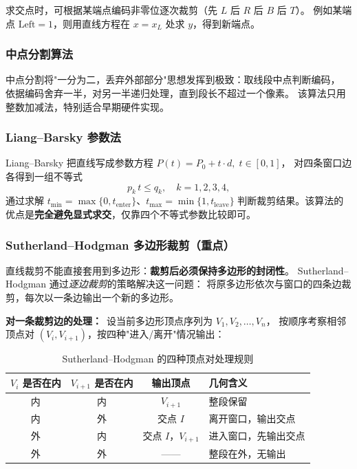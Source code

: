 \documentclass[a4paper,12pt]{ctexart}
\begin{document}
求交点时，可根据某端点编码非零位逐次裁剪（先 $L$ 后 $R$ 后 $B$ 后 $T$）。
例如某端点 $\text{Left}=1$，则用直线方程在 $x=x_L$ 处求 $y$，得到新端点。

\subsubsection{中点分割算法}

中点分割将"一分为二，丢弃外部部分"思想发挥到极致：取线段中点判断编码，
依据编码舍弃一半，对另一半递归处理，直到段长不超过一个像素。
该算法只用整数加减法，特别适合早期硬件实现。

\subsubsection{Liang–Barsky 参数法}

Liang–Barsky 把直线写成参数方程 $P(t) = P_0 + t\cdot d,\;t\in[0,1]$，
对四条窗口边各得到一组不等式
\[
    p_k\,t \le q_k,\quad k=1,2,3,4 ,
\]
通过求解 $t_{\min}=\max\{0,t_{\text{enter}}\}$、$t_{\max}=\min\{1,t_{\text{leave}}\}$
判断裁剪结果。该算法的优点是\textbf{完全避免显式求交}，仅靠四个不等式参数比较即可。

\subsubsection{Sutherland–Hodgman 多边形裁剪（重点）}

直线裁剪不能直接套用到多边形：\textbf{裁剪后必须保持多边形的封闭性}。
Sutherland–Hodgman 通过\emph{逐边裁剪}的策略解决这一问题：
将原多边形依次与窗口的四条边裁剪，每次以一条边输出一个新的多边形。

\textbf{对一条裁剪边的处理：}\ 设当前多边形顶点序列为 $V_1,V_2,\dots,V_n$，
按顺序考察相邻顶点对 $(V_i,V_{i+1})$，按四种"进入/离开"情况输出：

\begin{table}[H]
\centering
\renewcommand{\arraystretch}{1.3}
\begin{tabular}{cccl}
\toprule
$V_i$ 是否在内 & $V_{i+1}$ 是否在内 & 输出顶点 & 几何含义 \\
\midrule
内 & 内 & $V_{i+1}$              & 整段保留 \\
内 & 外 & 交点 $I$              & 离开窗口，输出交点 \\
外 & 内 & 交点 $I$，$V_{i+1}$    & 进入窗口，先输出交点 \\
外 & 外 & ——                    & 整段在外，无输出 \\
\bottomrule
\end{tabular}
\caption{Sutherland–Hodgman 的四种顶点对处理规则}
\end{table}
\end{document}
